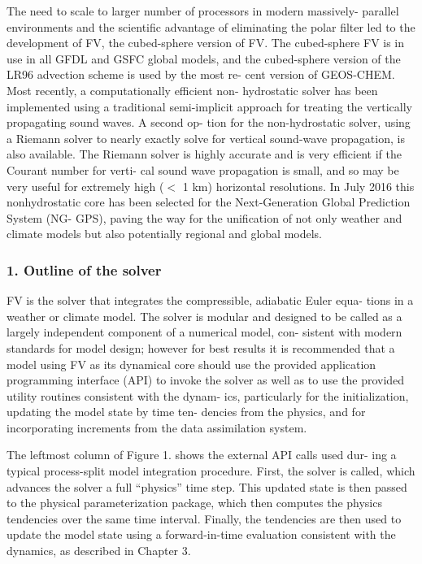 The need to scale to larger number of processors in modern massively-\/ parallel environments and the scientific advantage of eliminating the polar filter led to the development of FV\textthreesuperior{}, the cubed-\/sphere version of FV. The cubed-\/sphere FV\textthreesuperior{} is in use in all G\+F\+DL and G\+S\+FC global models, and the cubed-\/sphere version of the L\+R96 advection scheme is used by the most re-\/ cent version of G\+E\+O\+S-\/\+C\+H\+EM. Most recently, a computationally efficient non-\/ hydrostatic solver has been implemented using a traditional semi-\/implicit approach for treating the vertically propagating sound waves. A second op-\/ tion for the non-\/hydrostatic solver, using a Riemann solver to nearly exactly solve for vertical sound-\/wave propagation, is also available. The Riemann solver is highly accurate and is very efficient if the Courant number for verti-\/ cal sound wave propagation is small, and so may be very useful for extremely high ($<$ 1 km) horizontal resolutions. In July 2016 this nonhydrostatic core has been selected for the Next-\/\+Generation Global Prediction System (N\+G-\/ G\+PS), paving the way for the unification of not only weather and climate models but also potentially regional and global models.

\subsubsection*{1. Outline of the solver}

FV\textthreesuperior{} is the solver that integrates the compressible, adiabatic Euler equa-\/ tions in a weather or climate model. The solver is modular and designed to be called as a largely independent component of a numerical model, con-\/ sistent with modern standards for model design; however for best results it is recommended that a model using FV\textthreesuperior{} as its dynamical core should use the provided application programming interface (A\+PI) to invoke the solver as well as to use the provided utility routines consistent with the dynam-\/ ics, particularly for the initialization, updating the model state by time ten-\/ dencies from the physics, and for incorporating increments from the data assimilation system.

The leftmost column of Figure 1. shows the external A\+PI calls used dur-\/ ing a typical process-\/split model integration procedure. First, the solver is called, which advances the solver a full “physics” time step. This updated state is then passed to the physical parameterization package, which then computes the physics tendencies over the same time interval. Finally, the tendencies are then used to update the model state using a forward-\/in-\/time evaluation consistent with the dynamics, as described in Chapter 3.

